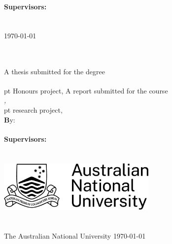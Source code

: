 \noindent
{\footnotesize \bfseries Supervisor\ifTwoSupervisors{}s\fi:}\\
{\footnotesize \FirstSupervisor%
\ifTwoSupervisors\\\SecondSupervisor\fi}\\[2 em]
\vfill
{\footnotesize \monthyeardate\today}



\else %



\begin{center}
\ \\[1em]
{\bfseries \Huge \ProjectTitle}\\[4em]
%
\ifHonoursThesis%
\Large{A thesis submitted for the degree}\\
\Large{\emph{\Degree}}\\[.5em]
{\ProjectPoints{} pt Honours project, \Semester{} \Year}
\else%
\Large{A report submitted for the course}\\
\Large{\emph{\CourseCode, \CourseName}}\\[.5em]
{\ProjectPoints{} pt research project, \Semester{} \Year}
\fi
%
\ \\[4em]
{\footnotesize \textbf By:}\\
\textbf{\AuthorName}\\[3em]
%
{\bfseries Supervisor\ifTwoSupervisors{}s\fi:}\\
{\FirstSupervisor%
\ifTwoSupervisors\\\SecondSupervisor\fi}\\[6em]
%
\includegraphics[height=2.5cm]{figures/ANU-logos/ANU_Primary_Horizontal_Black.jpg}\ \\[3em]
%
{\bfseries \School}\\
{\mdseries \College}\\
The Australian National University
%
\vfill
\normalsize{\monthyeardate\today}
\end{center}



\fi


\restoregeometry
